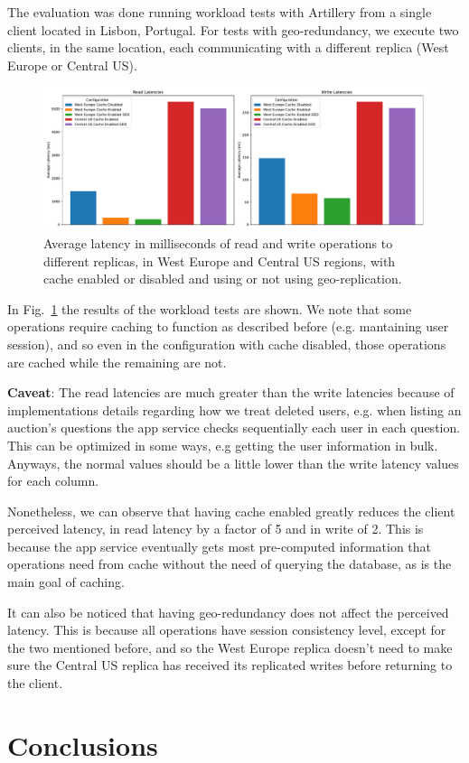 \documentclass[runningheads]{llncs}
\begin{document}
The evaluation was done running workload tests with Artillery from a single client located in Lisbon, Portugal. For tests with geo-redundancy, we execute two clients, in the same location, each communicating with a different replica (West Europe or Central US).

\begin{figure}
    \includegraphics[width=\textwidth]{latencies.pdf}
    \caption{Average latency in milliseconds of read and write operations to different replicas, in West Europe and Central US regions, with cache enabled or disabled and using or not using geo-replication.} \label{fig:latencies}
\end{figure}

In Fig.~\ref{fig:latencies} the results of the workload tests are shown. We note that some operations require caching to function as described before (e.g. mantaining user session), and so even in the configuration with cache disabled, those operations are cached while the remaining are not.

\textbf{Caveat}: The read latencies are much greater than the write latencies because of implementations details regarding how we treat deleted users, e.g. when listing an auction's questions the app service checks sequentially each user in each question. This can be optimized in some ways, e.g getting the user information in bulk. Anyways, the normal values should be a little lower than the write latency values for each column.

Nonetheless, we can observe that having cache enabled greatly reduces the client perceived latency, in read latency by a factor of 5 and in write of 2. This is because the app service eventually gets most pre-computed information that operations need from cache without the need of querying the database, as is the main goal of caching.

It can also be noticed that having geo-redundancy does not affect the perceived latency. This is because all operations have session consistency level, except for the two mentioned before, and so the West Europe replica doesn't need to make sure the Central US replica has received its replicated writes before returning to the client. 

\section{Conclusions}


\end{document}
